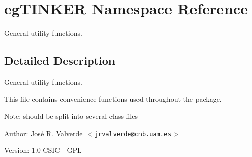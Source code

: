 \section{eg\-TINKER Namespace Reference}
\label{namespaceegTINKER}
General utility functions.  




\subsection{Detailed Description}
General utility functions. 

This file contains convenience functions used throughout the package.

\begin{Desc}
\item[Note:]should be split into several class files\end{Desc}
\begin{Desc}
\item[Author:]Jos\'{e} R. Valverde $<${\tt jrvalverde@cnb.uam.es}$>$ \end{Desc}
\begin{Desc}
\item[Version:]1.0  CSIC - GPL \end{Desc}



